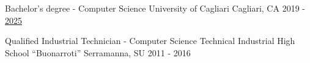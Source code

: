 

\begin{cventries}

  \cventry
    {Bachelor's degree - Computer Science} %
    {University of Cagliari} %
    {Cagliari, CA} %
    {2019 - \underline{2025}} %
    {}
    
  \cventry
    {Qualified Industrial Technician - Computer Science} %
    {Technical Industrial High School “Buonarroti”} %
    {Serramanna, SU} %
    {2011 - 2016} %
    {}
\end{cventries}
